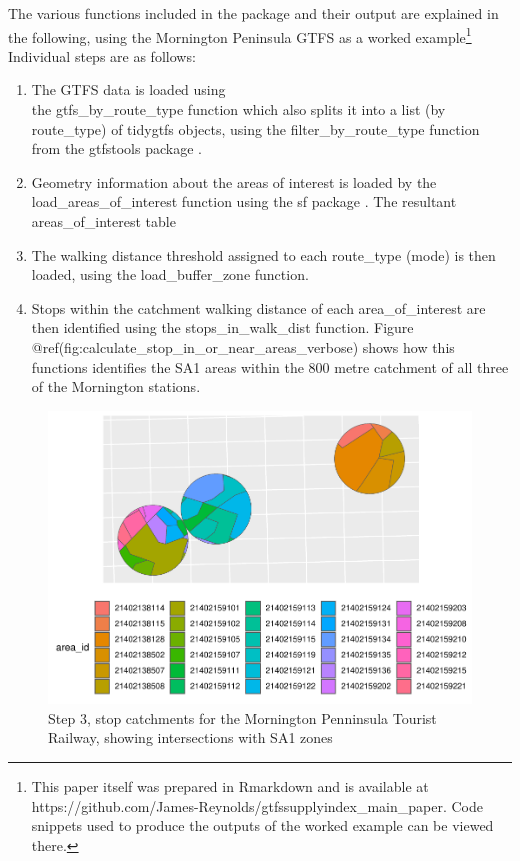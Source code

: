 \documentclass[preprint, 3p,
authoryear]{elsarticle} %
\begin{document}
The various functions included in the package and their output are
explained in the following, using the Mornington Peninsula GTFS as a
worked example\footnote{This paper itself was prepared in Rmarkdown and
  is available at
  https://github.com/James-Reynolds/gtfssupplyindex\_main\_paper. Code
  snippets used to produce the outputs of the worked example can be
  viewed there.} Individual steps are as follows:

\begin{enumerate}
\def\labelenumi{(\arabic{enumi})}
\item
  The GTFS data is loaded using\\
  the gtfs\_by\_route\_type function which also splits it into a list
  (by route\_type) of tidygtfs objects, using the
  filter\_by\_route\_type function from the gtfstools package
  \citep{filter_GTFS_by_mode}.
\item
  Geometry information about the areas of interest is loaded by the
  load\_areas\_of\_interest function using the sf package \citep{R-sf}.
  The resultant areas\_of\_interest table
\item
  The walking distance threshold assigned to each route\_type (mode) is
  then loaded, using the load\_buffer\_zone function.
\item
  Stops within the catchment walking distance of each area\_of\_interest
  are then identified using the stops\_in\_walk\_dist function. Figure
  @ref(fig:calculate\_stop\_in\_or\_near\_areas\_verbose) shows how this
  functions identifies the SA1 areas within the 800 metre catchment of
  all three of the Mornington stations.
\end{enumerate}

\begin{figure}
\includegraphics[width=1\linewidth]{Leveraging_GTFS_to_assess_transit_supply_Transport_Geography_files/figure-latex/calculate_stop_in_or_near_areas_verbose-1} \caption{Step 3, stop catchments for the Mornington Penninsula Tourist Railway, showing intersections with SA1 zones}\label{fig:calculate_stop_in_or_near_areas_verbose}
\end{figure}
\end{document}
